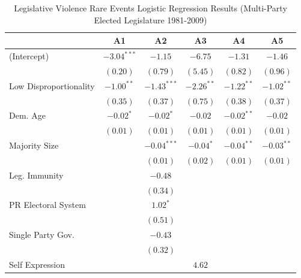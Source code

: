 \documentclass[a4paper]{article}\usepackage{graphicx, color}
\begin{document}
\begin{table}
\caption{Legislative Violence Rare Events Logistic Regression Results (Multi-Party Elected Legislature 1981-2009)}
\label{outputTable.dem}
\begin{center}

\begin{tabular}{l c c c c c }
\hline
                       & A1 & A2 & A3 & A4 & A5 \\
\hline
(Intercept)            & $-3.04^{***}$ & $-1.15$       & $-6.75$      & $-1.31$      & $-1.46$      \\
                       & $(0.20)$      & $(0.79)$      & $(5.45)$     & $(0.82)$     & $(0.96)$     \\
Low Disproportionality & $-1.00^{**}$  & $-1.43^{***}$ & $-2.26^{**}$ & $-1.22^{**}$ & $-1.02^{**}$ \\
                       & $(0.35)$      & $(0.37)$      & $(0.75)$     & $(0.38)$     & $(0.37)$     \\
Dem. Age               & $-0.02^{*}$   & $-0.02^{*}$   & $-0.02$      & $-0.02^{**}$ & $-0.02$      \\
                       & $(0.01)$      & $(0.01)$      & $(0.01)$     & $(0.01)$     & $(0.01)$     \\
Majority Size          &               & $-0.04^{***}$ & $-0.04^{*}$  & $-0.04^{**}$ & $-0.03^{**}$ \\
                       &               & $(0.01)$      & $(0.02)$     & $(0.01)$     & $(0.01)$     \\
Leg. Immunity          &               & $-0.48$       &              &              &              \\
                       &               & $(0.34)$      &              &              &              \\
PR Electoral System    &               & $1.02^{*}$    &              &              &              \\
                       &               & $(0.51)$      &              &              &              \\
Single Party Gov.      &               & $-0.43$       &              &              &              \\
                       &               & $(0.32)$      &              &              &              \\
Self Expression        &               &               & $4.62$       &              &              \\

\end{tabular}
\end{center}
\end{table}
\end{document}
